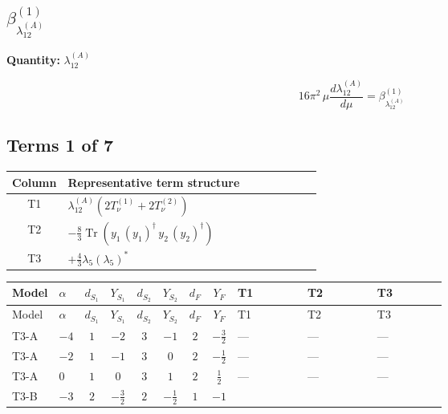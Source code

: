 \documentclass[8pt]{article}
\begin{document}
\begin{landscape}
\section*{$\beta_{\lambda_{12}^{(A)}}^{(1)}$}
\noindent\textbf{Quantity: }$\lambda_{12}^{(A)}$\par\smallskip
\[16\pi^2\,\mu\frac{d \lambda_{12}^{(A)}}{d\mu}=\beta_{\lambda_{12}^{(A)}}^{(1)}\]
\subsection*{Terms 1 of 7}
\begin{center}
\begin{tabular}{@{}c >{\raggedright\arraybackslash}p{0.82\linewidth}@{}}
\toprule
Column & Representative term structure \\
\midrule
T1 & \(\displaystyle {\lambda_{12}^{(A)}} (2 T_{\nu}^{(1)}+2 T_{\nu}^{(2)})\) \\
\midrule
T2 & \(\displaystyle -\frac{8}{3} \operatorname{Tr}\!\left({y_1}\,\left({y_1}\right)^{\dagger}\,{y_2}\,\left({y_2}\right)^{\dagger}\right)\) \\
\midrule
T3 & \(\displaystyle +\frac{4}{3} {\lambda_5} \left({\lambda_5}\right)^{*}\) \\
\midrule
\bottomrule
\end{tabular}
\end{center}
\smallskip
\tiny
\begin{longtable}{@{}llcccccc >{\raggedright\arraybackslash}p{0.21\linewidth} >{\raggedright\arraybackslash}p{0.21\linewidth} >{\raggedright\arraybackslash}p{0.21\linewidth}@{}}
\toprule
Model & $\alpha$ & $d_{S_1}$ & $Y_{S_1}$ & $d_{S_2}$ & $Y_{S_2}$ & $d_F$ & $Y_F$ & T1 & T2 & T3 \\
\midrule
\endfirsthead
\toprule
Model & $\alpha$ & $d_{S_1}$ & $Y_{S_1}$ & $d_{S_2}$ & $Y_{S_2}$ & $d_F$ & $Y_F$ & T1 & T2 & T3 \\
\midrule
\endhead
T3-A & $-4$ & $1$ & $-2$ & $3$ & $-1$ & $2$ & $-\frac{3}{2}$ & --- & --- & --- \\
\midrule
T3-A & $-2$ & $1$ & $-1$ & $3$ & $0$ & $2$ & $-\frac{1}{2}$ & --- & --- & --- \\
\midrule
T3-A & $0$ & $1$ & $0$ & $3$ & $1$ & $2$ & $\frac{1}{2}$ & --- & --- & --- \\
\midrule
T3-B & $-3$ & $2$ & $-\frac{3}{2}$ & $2$ & $-\frac{1}{2}$ & $1$ & $-1$ & \scriptsize\adjustbox{max width=\linewidth}{$\begin{gathered} {\lambda_{12}^{(A)}} (2 T_{\nu}^{(1)}+2 T_{\nu}^{(2)})\end{gathered}$} & \scriptsize\adjustbox{max width=\linewidth}{$\begin{gathered} -\frac{8}{3} \operatorname{Tr}\!\left({y_1}\,\left({y_1}\right)^{\dagger}\,{y_2}\,\left({y_2}\right)^{\dagger}\right)\end{gathered}$} & \scriptsize\adjustbox{max width=\linewidth}{$\begin{gathered} +\frac{4}{3} {\lambda_5} \left({\lambda_5}\right)^{*}\end{gathered}$} \\

\end{longtable}
\end{landscape}
\end{document}

